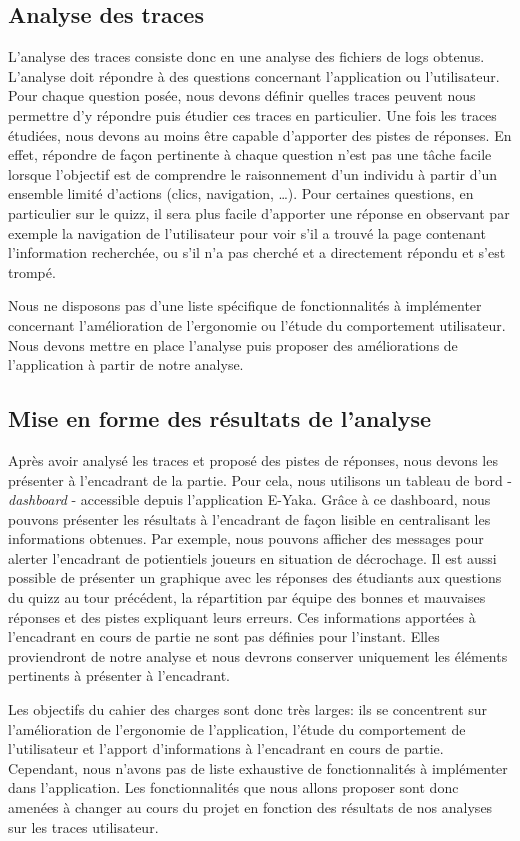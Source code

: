         \subsection{Analyse des traces}
        
            L’analyse des traces consiste donc en une analyse des fichiers de logs obtenus. L’analyse doit répondre à des questions concernant l’application ou l’utilisateur. Pour chaque question posée, nous devons définir quelles traces peuvent nous permettre d’y répondre puis étudier ces traces en particulier. Une fois les traces étudiées, nous devons au moins être capable d’apporter des pistes de réponses. En effet, répondre de façon pertinente à chaque question n’est pas une tâche facile lorsque l’objectif est de comprendre le raisonnement d’un individu à partir d’un ensemble limité d’actions (clics, navigation, …). Pour certaines questions, en particulier sur le quizz, il sera plus facile d’apporter une réponse en observant par exemple la navigation de l’utilisateur pour voir s’il a trouvé la page contenant l’information recherchée, ou s’il n’a pas cherché et a directement répondu et s’est trompé.
            
            Nous ne disposons pas d'une liste spécifique de fonctionnalités à implémenter concernant l’amélioration de l’ergonomie ou l’étude du comportement utilisateur. Nous devons mettre en place l’analyse puis proposer des améliorations de l’application à partir de notre analyse.

            \subsection{Mise en forme des résultats de l'analyse} 
            Après avoir analysé les traces et proposé des pistes de réponses, nous devons les présenter à l'encadrant de la partie. Pour cela, nous utilisons un tableau de bord - \emph{dashboard} - accessible depuis l'application E-Yaka. Grâce à ce dashboard, nous pouvons présenter les résultats à l'encadrant de façon lisible en centralisant les informations obtenues. Par exemple, nous pouvons afficher des messages pour alerter l'encadrant de potientiels joueurs en situation de décrochage. Il est aussi possible de présenter un graphique avec les réponses des étudiants aux questions du quizz au tour précédent, la répartition par équipe des bonnes et mauvaises réponses et des pistes expliquant leurs erreurs. Ces informations apportées à l’encadrant en cours de partie ne sont pas définies pour l'instant. Elles proviendront de notre analyse et nous devrons conserver uniquement les éléments pertinents à présenter à l’encadrant. 
            
            Les objectifs du cahier des charges sont donc très larges: ils se concentrent sur l’amélioration de l’ergonomie de l’application, l’étude du comportement de l’utilisateur et l’apport d’informations à l’encadrant en cours de partie. Cependant, nous n’avons pas de liste exhaustive de fonctionnalités à implémenter dans l’application. Les fonctionnalités que nous allons proposer sont donc amenées à changer au cours du projet en fonction des résultats de nos analyses sur les traces utilisateur.
            